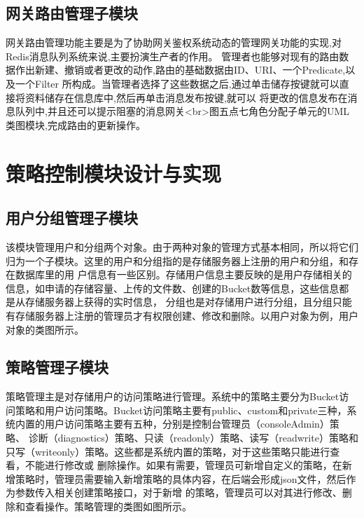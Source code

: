 \subsection{网关路由管理子模块}


网关路由管理功能主要是为了协助网关鉴权系统动态的管理网关功能的实现,对Redis消息队列系统来说,主要扮演生产者的作用。
管理者也能够对现有的路由数据作出新建、撤销或者更改的动作,路由的基础数据由ID、URI、一个Predicate,以及一个Filter
所构成。当管理者选择了这些数据之后,通过单击储存按键就可以直接将资料储存在信息库中,然后再单击消息发布按键,就可以
将更改的信息发布在消息队列中,并且还可以提示阻塞的消息网关<br>图五点七角色分配子单元的UML类图模块,完成路由的更新操作。

\section{策略控制模块设计与实现}

\subsection{用户分组管理子模块}

该模块管理用户和分组两个对象。由于两种对象的管理方式基本相同，所以将它们归为一个子模块。这里的用户和分组指的是存储服务器上注册的用户和分组，和存在数据库里的用
户信息有一些区别。存储用户信息主要反映的是用户存储相关的信息，如申请的存储容量、上传的文件数、创建的Bucket数等信息，这些信息都是从存储服务器上获得的实时信息，
分组也是对存储用户进行分组，且分组只能有存储服务器上注册的管理员才有权限创建、修改和删除。以用户对象为例，用户对象的类图所示。

\subsection{策略管理子模块}

策略管理主是对存储用户的访问策略进行管理。系统中的策略主要分为Bucket访问策略和用户访问策略。Bucket访问策略主要有public、custom和private三种，系统内置的用户访问策略主要有五种，分别是控制台管理员（consoleAdmin）策略、
诊断（diagnostics）策略、只读（readonly）策略、读写（readwrite）策略和只写（writeonly）策略。这些都是系统内置的策略，对于这些策略只能进行查看，不能进行修改或
删除操作。如果有需要，管理员可新增自定义的策略，在新增策略时，管理员需要输入新增策略的具体内容，在后端会形成json文件，然后作为参数传入相关创建策略接口，对于新增
的策略，管理员可以对其进行修改、删除和查看操作。策略管理的类图如图所示。

